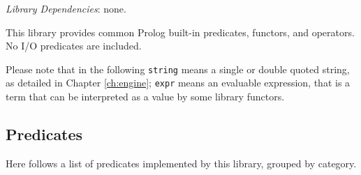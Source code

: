 \noindent \emph{Library Dependencies}: none.

This library provides common Prolog built-in predicates,
functors, and operators. No I/O predicates are included.

Please note that in the following \texttt{string} means a single or
double quoted string, as detailed in Chapter \ref{ch:engine};
\texttt{expr} means an evaluable expression, that is a term that can
be interpreted as a value by some library functors.

\subsection{Predicates}

\noindent Here follows a list of predicates implemented by this
library, grouped by category.

